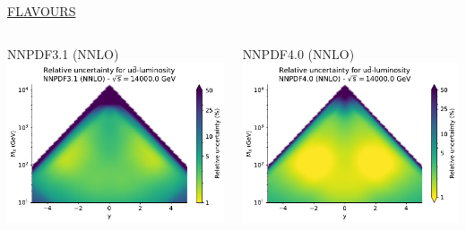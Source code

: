 \documentclass{beamer}
\begin{document}
\begin{frame}
\begin{overlayarea}{\textwidth}{5.2cm}
{\begin{columns}[c]
\begin{column}{0.5\textwidth}
   \end{column}
  \end{columns}  
  }
  {
  \centering
  \underline{FLAVOURS}\\
  \begin{columns}[c]
   \begin{column}{0.5\textwidth}
    \centering
        NNPDF3.1 (NNLO)\\
        \vspace{0.1cm}
        \includegraphics[width=\columnwidth]{plots/plot_lumi2d_uncertainty_NNPDF31_udbar}\\
   \end{column}
   \begin{column}{0.5\textwidth}
    \centering
        NNPDF4.0 (NNLO)\\
        \vspace{0.1cm}
        \includegraphics[width=\columnwidth]{plots/plot_lumi2d_uncertainty_NNPDF40_udbar}\\    

\end{column}
\end{columns}}
\end{overlayarea}
\end{frame}
\end{document}
